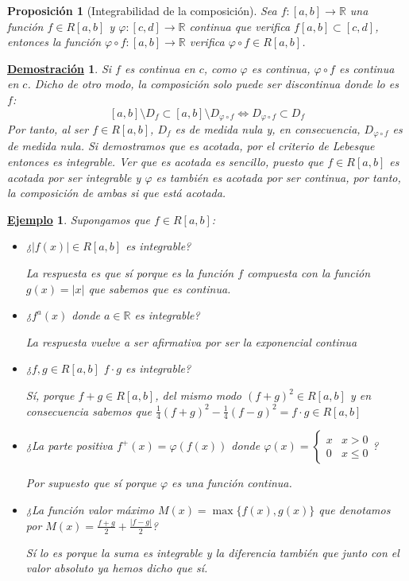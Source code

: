 \documentclass[10pt,a4paper,openright]{book}
\theoremstyle{break}
\newtheorem{prop}{Proposición}[chapter]
\newtheorem*{demo}{\underline{Demostración}}
\newtheorem{ej}{\underline{Ejemplo}}[chapter]
\begin{document}
\begin{prop}[Integrabilidad de la composición]
Sea $f:[a,b]\rightarrow \mathbb R$ una función $f\in R[a,b]$ y $\varphi: [c,d]\rightarrow \mathbb R$ continua que verifica $f[a,b]\subset[c,d]$, entonces la función $\varphi \circ f: [a,b]\rightarrow \mathbb R$ verifica $\varphi\circ f \in R[a,b]$.
\end{prop}
\begin{demo}
Si $f$ es continua en $c$, como $\varphi$ es continua, $\varphi\circ f$ es continua en $c$. Dicho de otro modo, la composición solo puede ser discontinua donde lo es $f$:
$$[a,b]\setminus D_f \subset [a,b]\setminus D_{\varphi \circ f} \Leftrightarrow D_{\varphi \circ f} \subset D_f$$
Por tanto, al ser $f\in R[a,b]$, $D_f$ es de medida nula y, en consecuencia, $D_{\varphi\circ f}$ es de medida nula. Si demostramos que es acotada, por el criterio de Lebesque entonces es integrable. Ver que es acotada es sencillo, puesto que $f\in R[a,b]$ es acotada  por ser integrable y $\varphi$ es también es acotada por ser continua, por tanto, la composición de ambas si que está acotada.
\end{demo}

\begin{ej}
Supongamos que $f\in R[a,b]$:
\begin{itemize}
\item ¿$|f(x)|\in R[a,b]$ es integrable?

La respuesta es que sí porque es la función $f$ compuesta con la función $g(x)=|x|$ que sabemos que es continua.

\item ¿$f^a(x)$ donde $a\in \mathbb R$ es integrable?

La respuesta vuelve a ser afirmativa por ser la exponencial continua

\item ¿$f,g\in R[a,b]$ $f\cdot g$ es integrable?

Sí, porque $f+g\in R[a,b]$, del mismo modo $(f+g)^2\in R[a,b]$ y en consecuencia sabemos que $\frac{1}{4}(f+g)^2-\frac{1}{4}(f-g)^2 = f\cdot g\in R[a,b]$

\item ¿La parte positiva $f^+(x)=\varphi(f(x))$ donde $\varphi(x)=\begin{cases} x & x>0 \\ 0 & x\leq 0\end{cases}$?

Por supuesto que sí porque $\varphi$ es una función continua.

\item ¿La función valor máximo $M(x)=\max\{f(x),g(x)\}$ que denotamos por $M(x)=\frac{f+g}{2}+\frac{|f-g|}{2}$?

Sí lo es porque la suma es integrable y la diferencia también que junto con el valor absoluto ya hemos dicho que sí.
\end{itemize}
\end{ej}
\end{document}
